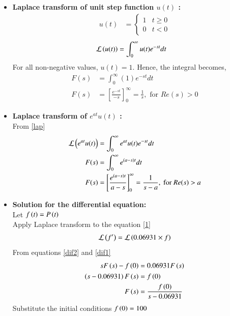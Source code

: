 \documentclass[journal]{IEEEtran}
\numberwithin{equation}{enumi}
\numberwithin{figure}{enumi}
\begin{document}
\begin{itemize}
    \item \textbf{Laplace transform of unit step function $u(t)$ :} \\
		\begin{align}
			u(t) &= 
			\begin{cases} 
			1 & t \geq 0 \\
			0 & t < 0
			\end{cases} \label{ut}
		\end{align}
		\begin{align}
			\mathcal{L} \left(u(t)\right) &= \int_{0}^{\infty} u(t) e^{-st} dt 
		\end{align}
		For all non-negative values, $u(t) = 1$. Hence, the integral becomes,
		\begin{align}
			F(s) &= \int_{0}^{\infty} (1)e^{-st} dt \\
			F(s) &= \left[ \frac{e^{-st}}{-s} \right]_{0}^{\infty} = \frac{1}{s} ,  \text{ for } Re(s) > 0 \label{eq:first}
		\end{align}
	\item \textbf{Laplace transform of $e^{at} u(t)$ :} \\
		From \eqref{lap}
		\begin{align}
			\mathcal{L} \left(e^{at} u(t)\right) &= \int_{0}^{\infty} e^{at} u(t) e^{-st} dt \\
			F(s) &= \int_{0}^{\infty} e^{(a-s)t} dt \\
			F(s) &= \left[\frac{e^{(a-s)t}}{a-s} \right]_{0}^{\infty} = \frac{1}{s-a} , \text{ for } Re(s) > a \label{req}
		\end{align}
    \item \textbf{Solution for the differential equation:}\\
    Let $f\left(t\right) = P\left(t\right)$\\
    Apply Laplace transform to the equation \eqref{1}
    \begin{align}
        \mathcal{L}\left(f^{\prime}\right) &= \mathcal{L}\left(0.06931\times f\right)\\
    \end{align}
    From equations \eqref{dif2} and \eqref{dif1}
    \begin{align}
        sF\left(s\right) - f\left(0\right) &= 0.06931F\left(s\right)\\
        \left(s - 0.06931\right)F\left(s\right) &= f\left(0\right)\\
        F\left(s\right) &= \frac{f\left(0\right)}{s - 0.06931}
    \end{align}
    Substitute the initial conditions $f\left(0\right) = 100$
    \begin{align}

\end{align}
\end{itemize}
\end{document}
